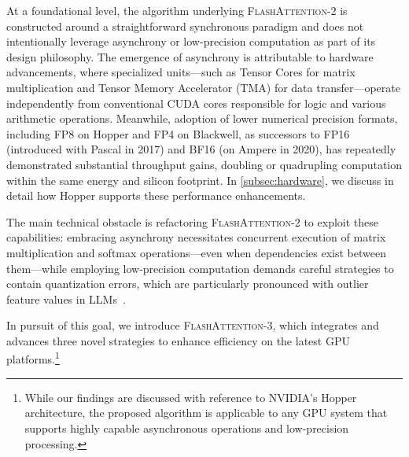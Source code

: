 At a foundational level, the algorithm underlying \textsc{FlashAttention-2} is constructed around a straightforward synchronous paradigm and does not intentionally leverage asynchrony or low-precision computation as part of its design philosophy. The emergence of asynchrony is attributable to hardware advancements, where specialized units—such as Tensor Cores for matrix multiplication and Tensor Memory Accelerator (TMA) for data transfer—operate independently from conventional CUDA cores responsible for logic and various arithmetic operations. Meanwhile, adoption of lower numerical precision formats, including FP8 on Hopper and FP4 on Blackwell, as successors to FP16 (introduced with Pascal in 2017) and BF16 (on Ampere in 2020), has repeatedly demonstrated substantial throughput gains, doubling or quadrupling computation within the same energy and silicon footprint. In \cref{subsec:hardware}, we discuss in detail how Hopper supports these performance enhancements.

The main technical obstacle is refactoring \textsc{FlashAttention-2} to exploit these capabilities: embracing asynchrony necessitates concurrent execution of matrix multiplication and softmax operations—even when dependencies exist between them—while employing low-precision computation demands careful strategies to contain quantization errors, which are particularly pronounced with outlier feature values in LLMs~\citep{dettmers2208llm, sun2024massive}.

In pursuit of this goal, we introduce \textsc{FlashAttention-3}, which integrates and advances three novel strategies to enhance efficiency on the latest GPU platforms.\footnote{While our findings are discussed with reference to NVIDIA's Hopper architecture, the proposed algorithm is applicable to any GPU system that supports highly capable asynchronous operations and low-precision processing.}

